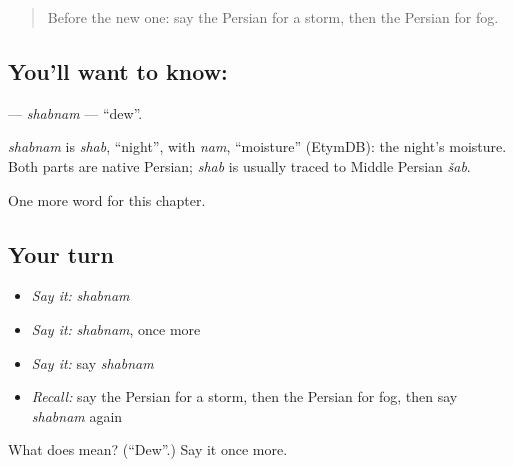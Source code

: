 \label{lesson:FA-C104-shabnam}



\begin{quote}
Before the new one: say the Persian for a storm, then the Persian for fog.
\end{quote}

\subsection*{You'll want to know: }
\textbf{} — \emph{shabnam} — \textquotedblleft{}dew\textquotedblright{}.

\begin{cousinweb}
\emph{shabnam} is \emph{shab}, \textquotedblleft{}night\textquotedblright{}, with \emph{nam}, \textquotedblleft{}moisture\textquotedblright{} (EtymDB): the night's moisture. Both parts are native Persian; \emph{shab} is usually traced to Middle Persian \emph{šab}.
\end{cousinweb}

\begin{grammarlens}[title={What you've built}]
One more word for this chapter.
\end{grammarlens}

\subsection*{Your turn}
\begin{itemize}
\raggedright
  \item \emph{Say it:} \emph{shabnam}
  \item \emph{Say it:} \emph{shabnam}, once more
  \item \emph{Say it:} say \emph{shabnam}
  \item \emph{Recall:} say the Persian for a storm, then the Persian for fog, then say \emph{shabnam} again
\end{itemize}

\begin{tcolorbox}[breakable,colback=teal!4,colframe=teal!35!black,title={Before you move on}]
What does  mean? (\textquotedblleft{}Dew\textquotedblright{}.) Say it once more.
\end{tcolorbox}
